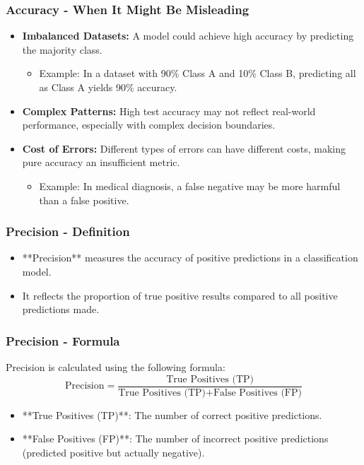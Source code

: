 \documentclass[aspectratio=169]{beamer}
\begin{document}
\begin{frame}[fragile]
    \frametitle{Accuracy - When It Might Be Misleading}
    \begin{itemize}
        \item \textbf{Imbalanced Datasets:} 
            A model could achieve high accuracy by predicting the majority class. 
            \begin{itemize}
                \item Example: In a dataset with 90\% Class A and 10\% Class B, predicting all as Class A yields 90\% accuracy.
            \end{itemize}
        
        \item \textbf{Complex Patterns:} 
            High test accuracy may not reflect real-world performance, especially with complex decision boundaries.
        
        \item \textbf{Cost of Errors:} 
            Different types of errors can have different costs, making pure accuracy an insufficient metric.
            \begin{itemize}
                \item Example: In medical diagnosis, a false negative may be more harmful than a false positive.
            \end{itemize}
    \end{itemize}
\end{frame}

\begin{frame}[fragile]
    \frametitle{Precision - Definition}
    \begin{itemize}
        \item **Precision** measures the accuracy of positive predictions in a classification model.
        \item It reflects the proportion of true positive results compared to all positive predictions made.
    \end{itemize}
\end{frame}

\begin{frame}[fragile]
    \frametitle{Precision - Formula}
    Precision is calculated using the following formula:
    \begin{equation}
        \text{Precision} = \frac{\text{True Positives (TP)}}{\text{True Positives (TP)} + \text{False Positives (FP)}}
    \end{equation}
    \begin{itemize}
        \item **True Positives (TP)**: The number of correct positive predictions.
        \item **False Positives (FP)**: The number of incorrect positive predictions (predicted positive but actually negative).
    \end{itemize}
\end{frame}
\end{document}
